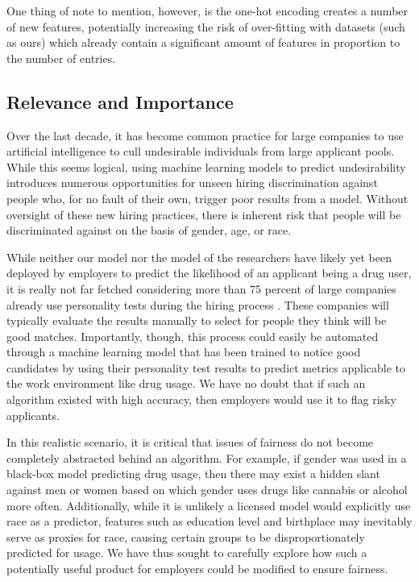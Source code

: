 \documentclass{article}
\begin{document}
    One thing of note to mention, however, is the one-hot encoding creates a number of new features, potentially increasing the risk of over-fitting with datasets (such as ours) which already contain a significant amount of features in proportion to the number of entries.


    \subsection*{Relevance and Importance}
    Over the last decade, it has become common practice for large companies to use artificial intelligence to cull undesirable individuals from large applicant pools. While this seems logical, using machine learning models to predict undesirability introduces numerous opportunities for unseen hiring discrimination against people who, for no fault of their own, trigger poor results from a model. Without oversight of these new hiring practices, there is inherent risk that people will be discriminated against on the basis of gender, age, or race.

    While neither our model nor the model of the researchers have likely yet been deployed by employers to predict the likelihood of an applicant being a drug user, it is really not far fetched considering more than 75 percent of large companies already use personality tests during the hiring process \cite{Claypool}. These companies will typically evaluate the results manually to select for people they think will be good matches. Importantly, though, this process could easily be automated through a machine learning model that has been trained to notice good candidates by using their personality test results to predict metrics applicable to the work environment like drug usage. We have no doubt that if such an algorithm existed with high accuracy, then employers would use it to flag risky applicants.

    In this realistic scenario, it is critical that issues of fairness do not become completely abstracted behind an algorithm. For example, if gender was used in a black-box model predicting drug usage, then there may exist a hidden slant against men or women based on which gender uses drugs like cannabis or alcohol more often. Additionally, while it is unlikely a licensed model would explicitly use race as a predictor, features such as education level and birthplace may inevitably serve as proxies for race, causing certain groups to be disproportionately predicted for usage. We have thus sought to carefully explore how such a potentially useful product for employers could be modified to ensure fairness.
\end{document}
